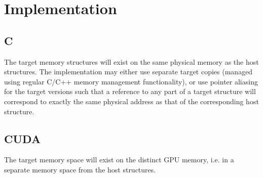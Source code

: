 

\section{Implementation}
\subsection{C}

The target memory structures will exist on the same physical memory as
the host structures. The implementation may either use separate target
copies (managed using regular C/C++ memory management functionality),
or use pointer aliasing for the target versions such that a reference
to any part of a target structure will correspond to exactly the same
physical address as that of the corresponding host structure.

\subsection{CUDA}

The target memory space will exist on the distinct GPU memory, i.e. in
a separate memory space from the host structures.
